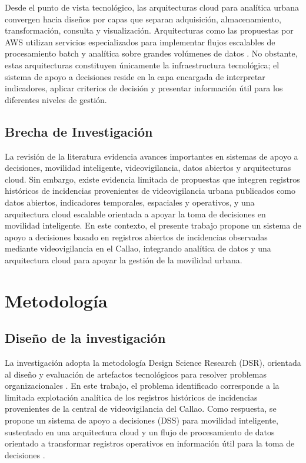 \documentclass[]{IEEEphot}
\begin{document}
Desde el punto de vista tecnológico, las arquitecturas cloud para analítica urbana convergen hacia diseños por capas que separan adquisición, almacenamiento, transformación, consulta y visualización. Arquitecturas como las propuestas por AWS utilizan servicios especializados para implementar flujos escalables de procesamiento batch y analítica sobre grandes volúmenes de datos \cite{aws2022analytics,aws2024batch}. No obstante, estas arquitecturas constituyen únicamente la infraestructura tecnológica; el sistema de apoyo a decisiones reside en la capa encargada de interpretar indicadores, aplicar criterios de decisión y presentar información útil para los diferentes niveles de gestión.

\subsection{Brecha de Investigación}

La revisión de la literatura evidencia avances importantes en sistemas de apoyo a decisiones, movilidad inteligente, videovigilancia, datos abiertos y arquitecturas cloud. Sin embargo, existe evidencia limitada de propuestas que integren registros históricos de incidencias provenientes de videovigilancia urbana publicados como datos abiertos, indicadores temporales, espaciales y operativos, y una arquitectura cloud escalable orientada a apoyar la toma de decisiones en movilidad inteligente. En este contexto, el presente trabajo propone un sistema de apoyo a decisiones basado en registros abiertos de incidencias observadas mediante videovigilancia en el Callao, integrando analítica de datos y una arquitectura cloud para apoyar la gestión de la movilidad urbana.



\section{Metodología}

\subsection{Diseño de la investigación}

La investigación adopta la metodología Design Science Research (DSR), orientada al diseño y evaluación de artefactos tecnológicos para resolver problemas organizacionales \cite{hevner2004design,peffers2007dsrm}. En este trabajo, el problema identificado corresponde a la limitada explotación analítica de los registros históricos de incidencias provenientes de la central de videovigilancia del Callao. Como respuesta, se propone un sistema de apoyo a decisiones (DSS) para movilidad inteligente, sustentado en una arquitectura cloud y un flujo de procesamiento de datos orientado a transformar registros operativos en información útil para la toma de decisiones \cite{shulajkovska2024artificial,salanova2022multilevel}.
\end{document}

